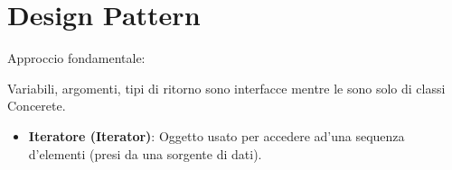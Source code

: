 \section{Design Pattern}
Approccio fondamentale:

\begin{center}
\end{center}

Variabili, argomenti, tipi di ritorno sono interfacce mentre le  sono solo di classi Concerete.

\begin{itemize}
	\item \textbf{Iteratore (Iterator)}: Oggetto usato per accedere ad'una sequenza d'elementi (presi da una sorgente di dati).


\end{itemize}
